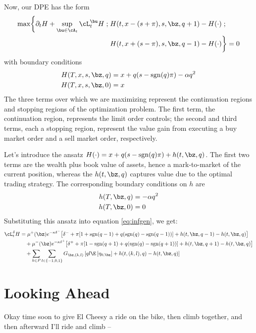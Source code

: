 \documentclass[12pt]{article}
\begin{document}
Now, our DPE has the form
\begin{equation}\label{eq:DPEmaxprofit}
\begin{split}
\max \biggl\lbrace \partial_t H + \sup \limits_{\bu \in \cA_t} \cL^{\bu}_t H \; ; \; & H(t,x-(s+\pi), s, \bz, q+1) - H(\cdot) \; ; \\
&  H(t,x+(s-\pi), s, \bz, q-1) - H(\cdot) \biggr\rbrace = 0
\end{split}
\end{equation}
with boundary conditions
\begin{align}
H(T, x, s, \bz, q) & = x + q(s - \mathrm{sgn}(q)\pi) - \alpha q^2 \\
H(T, x, s, \bz, 0) & = x
\end{align}
The three terms over which we are maximizing represent the continuation regions and stopping regions of the optimization problem. The first term, the continuation region, represents the limit order controls; the second and third terms, each a stopping region, represent the value gain from executing a buy market order and a sell market order, respectively.

Let's introduce the ansatz $H(\cdot) = x + q(s - \mathrm{sgn}(q)\pi) + h(t,\bz,q)$. The first two terms are the wealth plus book value of assets, hence a mark-to-market of the current position, whereas the $h(t,\bz,q)$ captures value due to the optimal trading strategy. The corresponding boundary conditions on $h$ are
\begin{align}
h(T, \bz, q) & = - \alpha q^2 \\
h(T, \bz, 0) & = 0
\end{align}
Substituting this ansatz into equation \ref{eq:infgen}, we get:
\begin{align*}
\cL^{\delta}_t H & = \mu^+(\bz) e^{ -\kappa \delta^{-}} \bigl[ \delta^- + \pi [ 1 + \mathrm{sgn}(q-1) + q(\mathrm{sgn}(q) - \mathrm{sgn}(q-1) ) ] + h(t,\bz,q-1) - h(t,\bz,q) \bigr] \\
& \quad + \mu^-(\bz) e^{ -\kappa \delta^{+}} \bigl[ \delta^+ + \pi [ 1 - \mathrm{sgn}(q+1) + q(\mathrm{sgn}(q) - \mathrm{sgn}(q+1) ) ] + h(t,\bz,q+1) - h(t,\bz,q) \bigr] \\
& \quad + \sum_{k\in P} \sum_{l \in \{-1,0,1\}} G_{\bz,(k,l)} \left[ ql \E \left[ \eta_{0,\bz} \right] + h(t,(k,l),q) - h(t,\bz,q) \right] 
\end{align*}

\section*{Looking Ahead}

Okay time soon to give El Cheesy a ride on the bike, then climb together, and then afterward I'll ride and climb --
\end{document}
